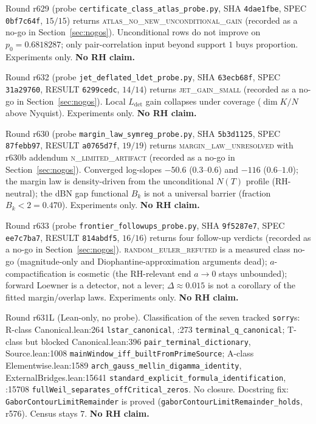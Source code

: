 \documentclass[11pt]{article}
\theoremstyle{definition}
\theoremstyle{remark}
\begin{document}
\noindent Round r629 (probe \texttt{certificate\_class\_atlas\_probe.py},
SHA \texttt{4dae1fbe}, SPEC \texttt{0bf7c64f}, $15/15$) returns
\textsc{atlas\_no\_new\_unconditional\_gain}
(recorded as a no-go in Section~\ref{sec:nogos}).  Unconditional
rows do not improve on $p_0=0.6818287$; only pair-correlation
input beyond support $1$ buys proportion.  Experiments only.
\textbf{No RH claim.}

\noindent Round r632 (probe \texttt{jet\_deflated\_ldet\_probe.py},
SHA \texttt{63ecb68f}, SPEC \texttt{31a29760}, RESULT
\texttt{6299cedc}, $14/14$) returns \textsc{jet\_gain\_small}
(recorded as a no-go in Section~\ref{sec:nogos}).  Local
$L_{\mathrm{det}}$ gain collapses under coverage
($\dim K/N$ above Nyquist).  Experiments only.
\textbf{No RH claim.}

\noindent Round r630 (probe \texttt{margin\_law\_symreg\_probe.py},
SHA \texttt{5b3d1125}, SPEC \texttt{87febb97}, RESULT
\texttt{a0765d7f}, $19/19$) returns
\textsc{margin\_law\_unresolved} with r630b addendum
\textsc{n\_limited\_artifact} (recorded as a no-go in
Section~\ref{sec:nogos}).  Converged log-slopes $-50.6$
($0.3$--$0.6$) and $-116$ ($0.6$--$1.0$); the margin law is
density-driven from the unconditional $N(T)$ profile
(RH-neutral); the dBN gap functional $B_k$ is not a
universal barrier (fraction $B_k<2=0.470$).  Experiments
only.  \textbf{No RH claim.}

\noindent Round r633 (probe \texttt{frontier\_followups\_probe.py},
SHA \texttt{9f5287e7}, SPEC \texttt{ee7c7ba7}, RESULT
\texttt{814abdf5}, $16/16$) returns four follow-up verdicts
(recorded as a no-go in Section~\ref{sec:nogos}).
\textsc{random\_euler\_refuted} is a measured class no-go
(magnitude-only and Diophantine-approximation arguments
dead); $a$-compactification is cosmetic (the RH-relevant
end $a\to 0$ stays unbounded); forward Loewner is a
detector, not a lever; $\Delta\approx 0.015$ is not a
corollary of the fitted margin/overlap laws.  Experiments
only.  \textbf{No RH claim.}

\noindent Round r631L (Lean-only, no probe).  Classification of
the seven tracked \texttt{sorry}s: R-class Canonical.lean:264
\texttt{lstar\_canonical}, :273 \texttt{terminal\_q\_canonical};
T-class but blocked Canonical.lean:396
\texttt{pair\_terminal\_dictionary}, Source.lean:1008
\texttt{mainWindow\_iff\_builtFromPrimeSource}; A-class
Elementwise.lean:1589 \texttt{arch\_gauss\_mellin\_digamma\_identity},
ExternalBridges.lean:15641
\texttt{standard\_explicit\_formula\_identification}, :15708
\texttt{fullWeil\_separates\_offCritical\_zeros}.  No closure.
Docstring fix: \texttt{GaborContourLimitRemainder} is proved
(\texttt{gaborContourLimitRemainder\_holds}, r576).  Census stays
$7$.  \textbf{No RH claim.}
\end{document}
